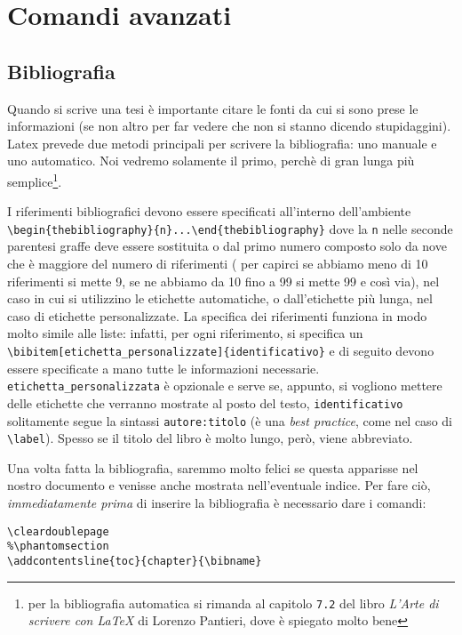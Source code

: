 \chapter{Comandi avanzati}

\section{Bibliografia}
Quando si scrive una tesi è importante citare le fonti da cui si sono prese le 
informazioni (se non altro per far vedere che non si stanno dicendo 
stupidaggini). Latex prevede due metodi principali per scrivere la 
bibliografia: uno manuale e uno automatico. Noi vedremo solamente il primo, 
perchè di gran lunga più semplice\footnote{per la bibliografia automatica si 
rimanda al capitolo \texttt{7.2} del libro \textit{L'Arte di scrivere con 
\LaTeX{}} di Lorenzo Pantieri, dove è spiegato molto bene}.
\par I riferimenti bibliografici devono essere specificati all'interno 
dell'ambiente \\\verb!\begin{thebibliography}{n}...\end{thebibliography}! dove 
la \texttt{n} nelle seconde parentesi graffe deve essere sostituita o dal 
primo numero composto solo da nove che è maggiore del numero di riferimenti (
per capirci se abbiamo meno di 10 riferimenti si mette 9, se ne abbiamo da 10 
fino a 99 si mette 99 e così via), nel caso in cui si utilizzino le etichette 
automatiche, o dall'etichette più lunga, nel caso di etichette personalizzate. 
La specifica dei riferimenti funziona in modo molto simile alle liste: 
infatti, per ogni riferimento, si specifica un 
\verb!\bibitem[etichetta_personalizzate]{identificativo}! e di seguito devono 
essere specificate a mano tutte le informazioni necessarie. 
\verb!etichetta_personalizzata! è opzionale e serve se, appunto, si vogliono 
mettere delle etichette che verranno mostrate al posto del testo, 
\verb!identificativo! solitamente segue la sintassi \verb!autore:titolo! (è 
una \textit{best practice}, come nel caso di \verb!\label!). Spesso se il 
titolo del libro è molto lungo, però, viene abbreviato. 
\par Una volta fatta la bibliografia, saremmo molto felici se questa apparisse 
nel nostro documento e venisse anche mostrata nell'eventuale indice. Per fare 
ciò, \emph{immediatamente prima} di inserire la bibliografia è necessario dare 
i comandi:
\begin{lstlisting}
\cleardoublepage
%\phantomsection
\addcontentsline{toc}{chapter}{\bibname}
\end{lstlisting}
